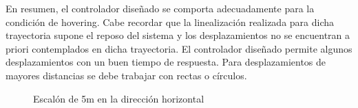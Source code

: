 \documentclass[main]{subfiles}
\begin{document}
En resumen, el controlador diseñado se comporta adecuadamente para la condici\'on de hovering. Cabe recordar que la linealizaci\'on realizada para dicha trayectoria supone el reposo del sistema y los desplazamientos no se encuentran a priori contemplados en dicha trayectoria. El controlador diseñado permite algunos desplazamientos con un buen tiempo de respuesta. Para desplazamientos de mayores distancias se debe trabajar con rectas o c\'irculos. 

\begin{figure}[h!]
  \centering
 
  \caption{Escal\'on de 5m en la direcci\'on horizontal}
  \label{fig:hov_esc_x}
\end{figure}
\end{document}
